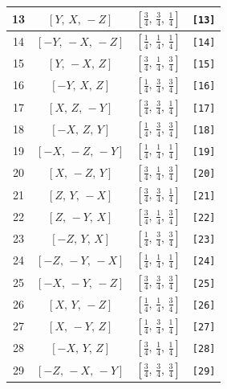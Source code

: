 \documentclass[fleqn,8pt]{jsarticle}
\begin{document}
\begin{longtable}{cccc}
13 & $\left[ Y,\, X,\, - Z \right]$ & $\left[ \frac{3}{4},\, \frac{3}{4},\, \frac{1}{4} \right]$ & {\tt [13]} \\ \hline
14 & $\left[ - Y,\, - X,\, - Z \right]$ & $\left[ \frac{1}{4},\, \frac{1}{4},\, \frac{1}{4} \right]$ & {\tt [14]} \\ \hline
15 & $\left[ Y,\, - X,\, Z \right]$ & $\left[ \frac{3}{4},\, \frac{1}{4},\, \frac{3}{4} \right]$ & {\tt [15]} \\ \hline
16 & $\left[ - Y,\, X,\, Z \right]$ & $\left[ \frac{1}{4},\, \frac{3}{4},\, \frac{3}{4} \right]$ & {\tt [16]} \\ \hline
17 & $\left[ X,\, Z,\, - Y \right]$ & $\left[ \frac{3}{4},\, \frac{3}{4},\, \frac{1}{4} \right]$ & {\tt [17]} \\ \hline
18 & $\left[ - X,\, Z,\, Y \right]$ & $\left[ \frac{1}{4},\, \frac{3}{4},\, \frac{3}{4} \right]$ & {\tt [18]} \\ \hline
19 & $\left[ - X,\, - Z,\, - Y \right]$ & $\left[ \frac{1}{4},\, \frac{1}{4},\, \frac{1}{4} \right]$ & {\tt [19]} \\ \hline
20 & $\left[ X,\, - Z,\, Y \right]$ & $\left[ \frac{3}{4},\, \frac{1}{4},\, \frac{3}{4} \right]$ & {\tt [20]} \\ \hline
21 & $\left[ Z,\, Y,\, - X \right]$ & $\left[ \frac{3}{4},\, \frac{3}{4},\, \frac{1}{4} \right]$ & {\tt [21]} \\ \hline
22 & $\left[ Z,\, - Y,\, X \right]$ & $\left[ \frac{3}{4},\, \frac{1}{4},\, \frac{3}{4} \right]$ & {\tt [22]} \\ \hline
23 & $\left[ - Z,\, Y,\, X \right]$ & $\left[ \frac{1}{4},\, \frac{3}{4},\, \frac{3}{4} \right]$ & {\tt [23]} \\ \hline
24 & $\left[ - Z,\, - Y,\, - X \right]$ & $\left[ \frac{1}{4},\, \frac{1}{4},\, \frac{1}{4} \right]$ & {\tt [24]} \\ \hline
25 & $\left[ - X,\, - Y,\, - Z \right]$ & $\left[ \frac{3}{4},\, \frac{3}{4},\, \frac{3}{4} \right]$ & {\tt [25]} \\ \hline
26 & $\left[ X,\, Y,\, - Z \right]$ & $\left[ \frac{1}{4},\, \frac{1}{4},\, \frac{3}{4} \right]$ & {\tt [26]} \\ \hline
27 & $\left[ X,\, - Y,\, Z \right]$ & $\left[ \frac{1}{4},\, \frac{3}{4},\, \frac{1}{4} \right]$ & {\tt [27]} \\ \hline
28 & $\left[ - X,\, Y,\, Z \right]$ & $\left[ \frac{3}{4},\, \frac{1}{4},\, \frac{1}{4} \right]$ & {\tt [28]} \\ \hline
29 & $\left[ - Z,\, - X,\, - Y \right]$ & $\left[ \frac{3}{4},\, \frac{3}{4},\, \frac{3}{4} \right]$ & {\tt [29]} \\ \hline

\end{longtable}
\end{document}
